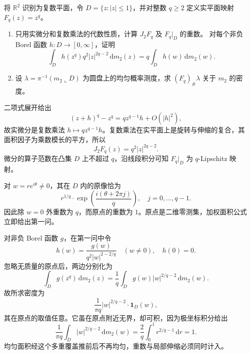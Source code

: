 \begin{exercise}\label{b1:ex:17-power-map-multiplicity}
将 \(\mathbb R^2\) 识别为复数平面，令 \(D=\{z:|z|\le1\}\)，并对整数 \(q\ge2\) 定义实平面映射 \(F_q(z)=z^q\)。
\begin{enumerate}
\item\label{b1:item:17-power-area}
只用实微分和复数乘法的代数性质，计算 \(J_2F_q\) 及 \(F_q|_D\) 的重数。
对每个非负 Borel 函数 \(h:D\to[0,\infty]\)，证明
\[
 \int_D h(z^q)q^2|z|^{2q-2}\,\mathrm dm_2(z)
 =q\int_Dh(w)\,\mathrm dm_2(w).
\]
\item\label{b1:item:17-power-pushforward}
设 \(\lambda=\pi^{-1}(m_2\llcorner D)\) 为圆盘上的均匀概率测度，求 \((F_q)_\#\lambda\) 关于 \(m_2\) 的密度。
\end{enumerate}
\end{exercise}
\begin{solution}
二项式展开给出
\[
 (z+h)^q-z^q=qz^{q-1}h+O(|h|^2),
\]
故实微分是复数乘法 \(h\mapsto qz^{q-1}h\)。复数乘法在实平面上是旋转与伸缩的复合，其面积因子为乘数模长的平方，所以
\[
 J_2F_q(z)=q^2|z|^{2q-2}.
\]
微分的算子范数在凸集 \(D\) 上不超过 \(q\)，沿线段积分可知 \(F_q|_D\) 为 \(q\)-Lipschitz 映射。

对 \(w=re^{i\theta}\ne0\)，其在 \(D\) 内的原像恰为
\[
 r^{1/q}\cdot \exp\left(\frac{i(\theta+2\pi j)}q\right),
 \quad j=0,\ldots,q-1.
\]
因此除 \(w=0\) 外重数为 \(q\)，而原点的重数为 \(1\)。原点是二维零测集，加权面积公式立即给出第一问。

对非负 Borel 函数 \(g\)，在第一问中令
\[
 h(w)=\frac{g(w)}{q^2|w|^{2-2/q}}\quad(w\ne0),
 \quad h(0)=0.
\]
忽略无质量的原点后，两边分别化为
\[
 \int_Dg(z^q)\,\mathrm dm_2(z)
 =\frac1q\int_Dg(w)|w|^{2/q-2}\,\mathrm dm_2(w).
\]
故所求密度为
\[
 \frac1{\pi q}|w|^{2/q-2}\cdot\mathbf1_D(w),
\]
其在原点的取值任意。它虽在原点附近无界，却可积，因为极坐标积分给出
\[
 \frac1{\pi q}\int_D|w|^{2/q-2}\,\mathrm dm_2(w)
 =\frac2q\int_0^1r^{2/q-1}\,\mathrm dr=1.
\]
均匀面积经这个多重覆盖推前后不再均匀，重数与局部伸缩必须同时计入。
\end{solution}

